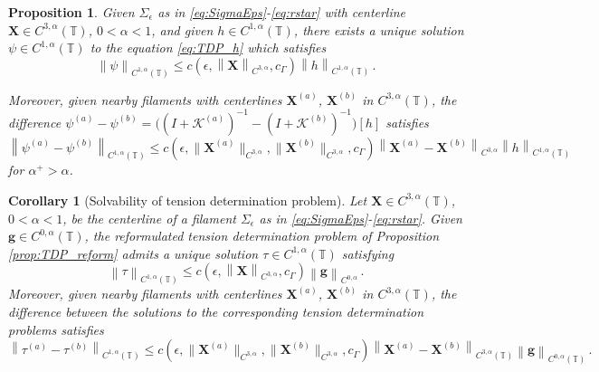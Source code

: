 \documentclass[10pt,a4paper]{amsart}
\newtheorem{proposition}{Proposition}
\newtheorem{corollary}{Corollary}
\newcommand{\T}{\mathbb{T}}
\newcommand{\X}{\bm{X}}
\newcommand{\mc}[1]{\mathcal{#1}}
\newcommand{\norm}[1]{\left\lVert #1 \right\rVert}
\begin{document}
\begin{proposition}\label{prop:tdp_qual}
  Given $\Sigma_\epsilon$ as in \eqref{eq:SigmaEps}-\eqref{eq:rstar} with centerline $\X\in C^{3,\alpha}(\T)$, $0<\alpha<1$, and given $h\in C^{1,\alpha}(\T)$, there exists a unique solution $\psi\in C^{1,\alpha}(\T)$ to the equation \eqref{eq:TDP_h} which satisfies
  \begin{equation}\label{eq:tauh_bd}
  \norm{\psi}_{C^{1,\alpha}(\T)}\le c(\epsilon,\norm{\X}_{C^{3,\alpha}},c_\Gamma)\norm{h}_{C^{1,\alpha}(\T)}\,.
  \end{equation}

Moreover, given nearby filaments with centerlines $\X^{(a)}$, $\X^{(b)}$ in $C^{3,\alpha}(\T)$, the difference $\psi^{(a)}-\psi^{(b)}= \big((I+\mc{K}^{(a)})^{-1}-(I+\mc{K}^{(b)})^{-1}\big)[h]$ satisfies  
  \begin{equation}\label{eq:tauh_lip}
  \norm{\psi^{(a)}-\psi^{(b)}}_{C^{1,\alpha}(\T)}\le c(\epsilon,\|\X^{(a)}\|_{C^{3,\alpha}},\|\X^{(b)}\|_{C^{3,\alpha}},c_\Gamma)\norm{\X^{(a)}-\X^{(b)}}_{C^{3,\alpha}}\norm{h}_{C^{1,\alpha}(\T)}
  \end{equation}
  for $\alpha^+>\alpha$.
\end{proposition}

\begin{corollary}[Solvability of tension determination problem]\label{cor:TDP_solve}
Let $\X\in C^{3,\alpha}(\T)$, $0<\alpha<1$, be the centerline of a filament $\Sigma_\epsilon$ as in \eqref{eq:SigmaEps}-\eqref{eq:rstar}. Given $\bm{g}\in C^{0,\alpha}(\T)$, the reformulated tension determination problem of Proposition \ref{prop:TDP_reform} admits a unique solution $\tau\in C^{1,\alpha}(\T)$ satisfying 
  \begin{equation}
    \norm{\tau}_{C^{1,\alpha}(\T)} \le c(\epsilon,\norm{\X}_{C^{3,\alpha}},c_\Gamma)\norm{\bm{g}}_{C^{0,\alpha}}\,.
  \end{equation}
%
Moreover, given nearby filaments with centerlines $\X^{(a)}$, $\X^{(b)}$ in $C^{3,\alpha}(\T)$, the difference between the solutions to the corresponding tension determination problems satisfies 
  \begin{equation}
    \norm{\tau^{(a)}-\tau^{(b)}}_{C^{1,\alpha}(\T)} \le c(\epsilon,\|\X^{(a)}\|_{C^{3,\alpha}},\|\X^{(b)}\|_{C^{3,\alpha}},c_\Gamma)\norm{\X^{(a)}-\X^{(b)}}_{C^{3,\alpha}(\T)}\norm{\bm{g}}_{C^{0,\alpha}(\T)}\,.
  \end{equation}  
\end{corollary}
\end{document}
